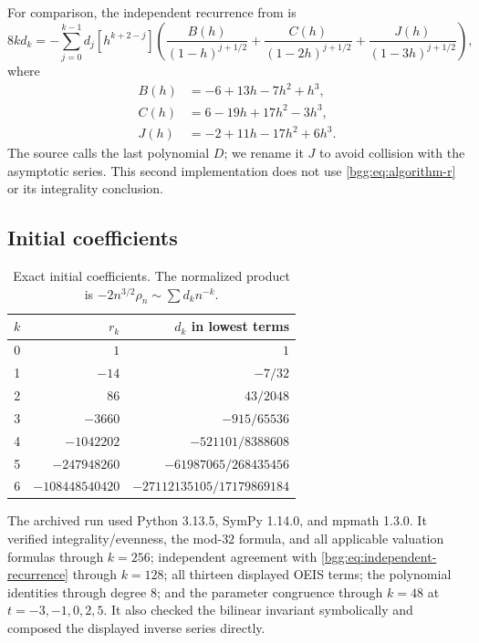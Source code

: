 \documentclass[11pt,a4paper]{article}
\numberwithin{equation}{section}
\theoremstyle{definition}
\theoremstyle{remark}
\theoremstyle{definition}
\begin{document}
For comparison, the independent recurrence from \cite[Lemma~14]{BGG} is
\begin{equation}\label{bgg:eq:independent-recurrence}
 8k d_k=-\sum_{j=0}^{k-1}d_j[h^{k+2-j}]
 \left(\frac{B(h)}{(1-h)^{j+1/2}}+
       \frac{C(h)}{(1-2h)^{j+1/2}}+
       \frac{J(h)}{(1-3h)^{j+1/2}}\right),
\end{equation}
where
\[
 \begin{aligned}
 B(h)&=-6+13h-7h^2+h^3,\\
 C(h)&=6-19h+17h^2-3h^3,\\
 J(h)&=-2+11h-17h^2+6h^3.
 \end{aligned}
\]
The source calls the last polynomial $D$; we rename it $J$ to avoid collision
with the asymptotic series. This second implementation does not use
\eqref{bgg:eq:algorithm-r} or its integrality conclusion.

\subsection{Initial coefficients}

\begin{table}[ht]
\centering
\caption{Exact initial coefficients. The normalized product is
$-2n^{3/2}\rho_n\sim\sum d_kn^{-k}$.}
\label{bgg:tab:coefficients}
\begin{tabular}{r r r}
\toprule
$k$ & $r_k$ & $d_k$ in lowest terms\\
\midrule
0 & $1$ & $1$\\
1 & $-14$ & $-7/32$\\
2 & $86$ & $43/2048$\\
3 & $-3660$ & $-915/65536$\\
4 & $-1042202$ & $-521101/8388608$\\
5 & $-247948260$ & $-61987065/268435456$\\
6 & $-108448540420$ & $-27112135105/17179869184$\\
\bottomrule
\end{tabular}
\end{table}

The archived run used Python 3.13.5, SymPy 1.14.0, and mpmath 1.3.0. It
verified integrality/evenness, the mod-$32$ formula, and all applicable
valuation formulas through $k=256$; independent agreement with
\eqref{bgg:eq:independent-recurrence} through $k=128$; all thirteen displayed
OEIS terms; the polynomial identities through degree $8$; and the parameter
congruence through $k=48$ at $t=-3,-1,0,2,5$. It also checked the bilinear
invariant symbolically and composed the displayed inverse series directly.
\end{document}
